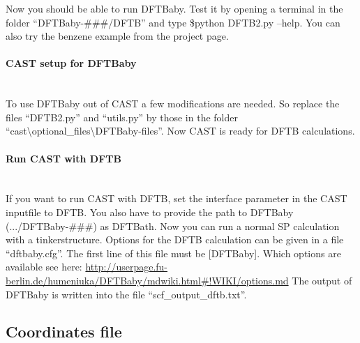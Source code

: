\documentclass[10pt,a4paper]{article} %
\begin{document}
Now you should be able to run DFTBaby. Test it by opening a terminal in the folder ``DFTBaby-\#\#\#/DFTB'' and type \$python DFTB2.py --help. You can also try the benzene example from the project page.

\paragraph{CAST setup for DFTBaby}\mbox{}\\

To use DFTBaby out of CAST a few modifications are needed. So replace the files ``DFTB2.py'' and ``utils.py'' by those in the folder ``cast\textbackslash optional\_files\textbackslash DFTBaby-files''. Now CAST is ready for DFTB calculations.

\paragraph{Run CAST with DFTB}\mbox{}\\

If you want to run CAST with DFTB, set the interface parameter in the CAST inputfile to DFTB. You also have to provide the path to DFTBaby (.../DFTBaby-\#\#\#) as DFTBath. Now you can run a normal SP calculation with a tinkerstructure. Options for the DFTB calculation can be given in a file ``dftbaby.cfg''. The first line of this file must be [DFTBaby]. Which options are available see here: \url{http://userpage.fu-berlin.de/humeniuka/DFTBaby/mdwiki.html#!WIKI/options.md} The output of DFTBaby is written into the file ``scf\_output\_dftb.txt''.
			
	\subsection{Coordinates file}
	
\end{document}
